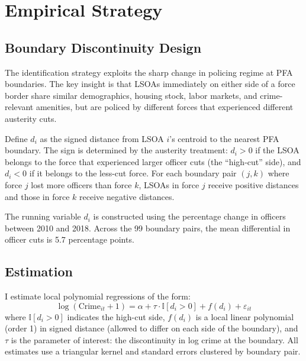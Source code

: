 \documentclass[12pt]{article}
\newcommand{\ind}{\mathbb{I}}
\begin{document}



\section{Empirical Strategy}

\subsection{Boundary Discontinuity Design}

The identification strategy exploits the sharp change in policing regime at PFA boundaries. The key insight is that LSOAs immediately on either side of a force border share similar demographics, housing stock, labor markets, and crime-relevant amenities, but are policed by different forces that experienced different austerity cuts.

Define $d_i$ as the signed distance from LSOA $i$'s centroid to the nearest PFA boundary. The sign is determined by the austerity treatment: $d_i > 0$ if the LSOA belongs to the force that experienced larger officer cuts (the ``high-cut'' side), and $d_i < 0$ if it belongs to the less-cut force. For each boundary pair $(j,k)$ where force $j$ lost more officers than force $k$, LSOAs in force $j$ receive positive distances and those in force $k$ receive negative distances.

The running variable $d_i$ is constructed using the percentage change in officers between 2010 and 2018. Across the 99 boundary pairs, the mean differential in officer cuts is 5.7 percentage points.

\subsection{Estimation}

I estimate local polynomial regressions of the form:
\begin{equation}
\log(\text{Crime}_{it} + 1) = \alpha + \tau \cdot \ind[d_i > 0] + f(d_i) + \varepsilon_{it}
\label{eq:main}
\end{equation}
where $\ind[d_i > 0]$ indicates the high-cut side, $f(d_i)$ is a local linear polynomial (order 1) in signed distance (allowed to differ on each side of the boundary), and $\tau$ is the parameter of interest: the discontinuity in log crime at the boundary. All estimates use a triangular kernel and standard errors clustered by boundary pair.
\end{document}
